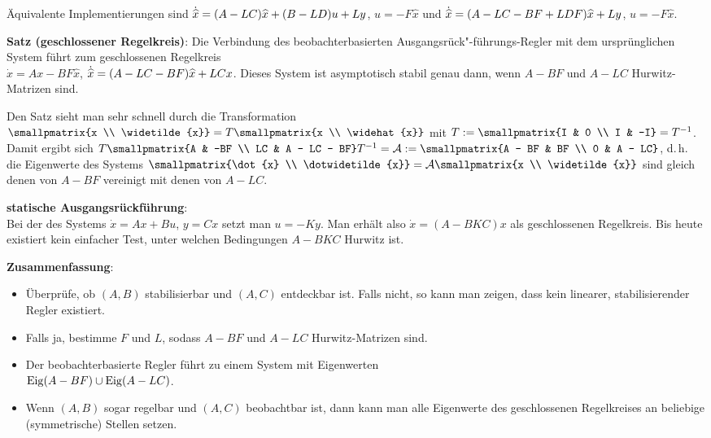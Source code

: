 Äquivalente Implementierungen sind
$\dotwidehat{x} = (A - LC) \widehat{x} + (B - LD)u + Ly$, $u = -F\widehat{x}$ und
$\dotwidehat{x} = (A - LC - BF + LDF) \widehat{x} + Ly$, $u = -F\widehat{x}$.

\textbf{Satz (geschlossener Regelkreis)}:
Die Verbindung des beobachterbasierten Ausgangsrück"-führungs-Regler mit dem ursprünglichen
System führt zum geschlossenen Regelkreis\\
$\dot{x}  = Ax - BF\widehat{x}$,
$\dotwidehat{x} = (A - LC - BF) \widehat{x} + LCx$.
Dieses System ist asymptotisch stabil genau dann, wenn $A - BF$ und $A - LC$ Hurwitz-Matrizen sind.

Den Satz sieht man sehr schnell durch die Transformation
$\smallpmatrix{x \\ \widetilde{x}} = T \smallpmatrix{x \\ \widehat{x}}$ mit
$T := \smallpmatrix{I & 0 \\ I & -I} = T^{-1}$.
Damit ergibt sich $T \smallpmatrix{A & -BF \\ LC & A - LC - BF} T^{-1} = \A
:= \smallpmatrix{A - BF & BF \\ 0 & A - LC}$, d.\,h. die Eigenwerte des Systems
$\smallpmatrix{\dot{x} \\ \dotwidetilde{x}} = \A \smallpmatrix{x \\ \widetilde{x}}$
sind gleich denen von $A - BF$ vereinigt mit denen von $A - LC$.

\linie

\textbf{statische Ausgangsrückführung}:\\
Bei der  des Systems
$\dot{x} = Ax + Bu$, $y = Cx$ setzt man $u = -Ky$.
Man erhält also $\dot{x} = (A - BKC)x$ als geschlossenen Regelkreis.
Bis heute existiert kein einfacher Test,
unter welchen Bedingungen $A - BKC$ Hurwitz ist.

\linie

\textbf{Zusammenfassung}:
\begin{itemize}
    \item
    Überprüfe, ob $(A, B)$ stabilisierbar und $(A, C)$ entdeckbar ist.
    Falls nicht, so kann man zeigen, dass kein linearer, stabilisierender Regler existiert.

    \item
    Falls ja, bestimme $F$ und $L$, sodass $A - BF$ und $A - LC$ Hurwitz-Matrizen sind.

    \item
    Der beobachterbasierte Regler führt zu einem System mit Eigenwerten\\
    $\operatorname{Eig}(A - BF) \cup \operatorname{Eig}(A - LC)$.

    \item
    Wenn $(A, B)$ sogar regelbar und $(A, C)$ beobachtbar ist, dann kann man alle Eigenwerte
    des geschlossenen Regelkreises an beliebige (symmetrische) Stellen setzen.
\end{itemize}

